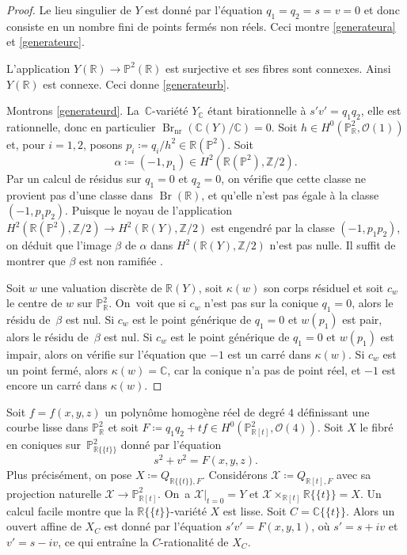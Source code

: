 \documentclass[11pt]{article}
\theoremstyle{definition}
\newcommand{\C}{\mathbb C}
\newcommand{\Z}{\mathbb Z}
\newcommand{\R}{\mathbb R}
\renewcommand{\P}{\mathbb P}
\newcommand{\Br}{\operatorname{Br}}
\newcommand{\mc}[1]{\mathcal{#1}}
\newcommand{\puiseux}{\mathbb{R}\{\!\{t\}\!\}}
\begin{document}
\begin{proof}
Le lieu singulier de $Y$ est donné par l'équation $q_{1}=q_{2}=s=v=0$ et donc consiste en un nombre fini de points fermés non réels. Ceci montre \eqref{generateura} et \eqref{generateurc}.

L'application $Y(\R) \to \P^2(\R)$ est surjective et ses fibres
sont connexes. Ainsi $Y(\R)$ est connexe. Ceci donne \eqref{generateurb}.

Montrons \eqref{generateurd}. La~$\C$-variété $Y_\C$ étant birationnelle à $s'v'= q_1q_2$, elle est rationnelle, donc en particulier $\Br_{\mathrm{nr}}(\C(Y)/\C)=0$. Soit $h\in H^0(\P^2_\R,\mc{O}(1))$ et, pour $i=1,2$, posons $p_i\coloneqq q_i/h^2\in \R(\P^2)$. Soit \[\alpha\coloneqq (-1,p_1)\in H^2(\R(\P^2), \Z/2).\] Par un calcul de résidus sur $q_1=0$ et $q_2=0$, on vérifie que cette classe ne provient pas d'une classe dans $\Br(\R)$, et qu'elle n'est pas égale à la classe $(-1, p_1p_2)$.
Puisque le noyau de l'application $H^2(\R(\P^2), \Z/2)\to H^2(\R(Y), \Z/2)$ est engendré par la classe $(-1, p_1p_2)$, on déduit que l'image $\beta$ de $\alpha$ dans $H^2(\R(Y), \Z/2)$ n'est pas nulle. Il suffit de montrer que $\beta$ est non ramifiée \cite[Prop.\,4.2.3(a)]{colliot1995birational}.

Soit $w$ une valuation discrète de $\R(Y)$, soit $\kappa(w)$ son corps résiduel et soit $c_w$ le centre de $w$ sur $\P^2_\R$. On~voit que si $c_w$
n'est pas sur la conique $q_1=0$, alors le résidu de~$\beta$ est nul. Si $c_w$ est le point générique de $q_1=0$ et $w(p_{1})$ est pair, alors le résidu de~$\beta$ est nul.
Si $c_w$ est le point générique de $q_1=0$ et $w(p_{1})$ est impair, alors on vérifie sur l'équation que $-1$ est un carré dans $\kappa(w)$. Si $c_w$ est un point fermé, alors $\kappa(w)=\C$, car la conique n'a pas de point réel, et $-1$ est encore un carré dans $\kappa(w)$.
\end{proof}

Soit $f=f(x,y,z)$ un polynôme homogène réel de degré $4$ définissant une courbe lisse dans $\P^2_\R$ et soit $F\coloneqq q_1q_2+tf\in H^0(\P^2_{\R[t]},\mc{O}(4))$. Soit $X$ le fibré en coniques sur~$\P^2_{\puiseux}$ donné par l'équation
\[s^2+v^2=F(x,y,z).\]
Plus précisément, on pose $X\coloneqq Q_{\puiseux,F}$. Considérons $\mc{X}\coloneqq Q_{\R[t],F}$ avec sa projection naturelle $\mc{X}\to \P^2_{\R[t]}$. On~a $\mc{X}|_{t=0}=Y$ et $\mc{X}\times_{\R[t]}\puiseux=X$. Un calcul facile montre que la $\puiseux$-variété $X$ est lisse. Soit $C=\C\{\!\{t\}\!\}$. Alors un ouvert affine de $X_C$ est donné par l'équation $s'v'=F(x,y,1)$, où $s'=s+iv$ et $v'=s-iv$, ce qui entraîne la $C$-rationalité de $X_C$.
\end{document}
